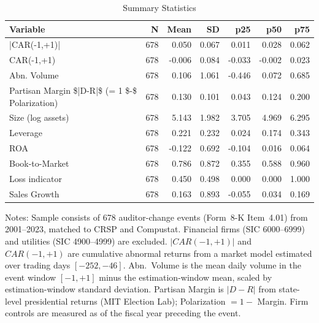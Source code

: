 \begin{table}
\caption{Summary Statistics}
\label{tab:summary}
\begin{tabular}{lrrrrrr}
\toprule
Variable & N & Mean & SD & p25 & p50 & p75 \\
\midrule
|CAR(-1,+1)| & 678 & 0.050 & 0.067 & 0.011 & 0.028 & 0.062 \\
CAR(-1,+1) & 678 & -0.006 & 0.084 & -0.033 & -0.002 & 0.023 \\
Abn. Volume & 678 & 0.106 & 1.061 & -0.446 & 0.072 & 0.685 \\
Partisan Margin \$|D-R|\$ (= 1 \$-\$ Polarization) & 678 & 0.130 & 0.101 & 0.043 & 0.124 & 0.200 \\
Size (log assets) & 678 & 5.143 & 1.982 & 3.705 & 4.969 & 6.295 \\
Leverage & 678 & 0.221 & 0.232 & 0.024 & 0.174 & 0.343 \\
ROA & 678 & -0.122 & 0.692 & -0.104 & 0.016 & 0.064 \\
Book-to-Market & 678 & 0.786 & 0.872 & 0.355 & 0.588 & 0.960 \\
Loss indicator & 678 & 0.450 & 0.498 & 0.000 & 0.000 & 1.000 \\
Sales Growth & 678 & 0.163 & 0.893 & -0.055 & 0.034 & 0.169 \\
\bottomrule
\end{tabular}
\begin{flushleft}
\footnotesize Notes: Sample consists of 678 auditor-change events (Form~8-K Item~4.01) from 2001--2023, matched to CRSP and Compustat. Financial firms (SIC 6000--6999) and utilities (SIC 4900--4999) are excluded. $|CAR(-1,+1)|$ and $CAR(-1,+1)$ are cumulative abnormal returns from a market model estimated over trading days $[-252, -46]$. Abn.\ Volume is the mean daily volume in the event window $[-1, +1]$ minus the estimation-window mean, scaled by estimation-window standard deviation. Partisan Margin is $|D - R|$ from state-level presidential returns (MIT Election Lab); Polarization $= 1 -$ Margin. Firm controls are measured as of the fiscal year preceding the event.
\end{flushleft}
\end{table}
